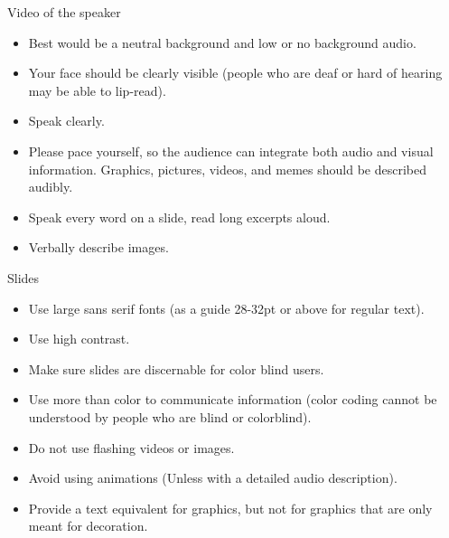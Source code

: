 \documentclass[
  ignorenonframetext,
]{beamer}
\providecommand{\tightlist}{%
  \setlength{\itemsep}{0pt}\setlength{\parskip}{0pt}}
\begin{document}
\begin{frame}

\begin{block}{Video of the speaker}

\begin{itemize}
\tightlist
\item
  Best would be a neutral background and low or no background audio.
\item
  Your face should be clearly visible (people who are deaf or hard of
  hearing may be able to lip-read).
\item
  Speak clearly.
\item
  Please pace yourself, so the audience can integrate both audio and
  visual information. Graphics, pictures, videos, and memes should be
  described audibly.
\item
  Speak every word on a slide, read long excerpts aloud.
\item
  Verbally describe images.
\end{itemize}

\end{block}

\end{frame}

\begin{frame}

\begin{block}{Slides}

\begin{itemize}
\tightlist
\item
  Use large sans serif fonts (as a guide 28-32pt or above for regular
  text).
\item
  Use high contrast.
\item
  Make sure slides are discernable for color blind users.
\item
  Use more than color to communicate information (color coding cannot be
  understood by people who are blind or colorblind).
\item
  Do not use flashing videos or images.
\item
  Avoid using animations (Unless with a detailed audio description).
\item
  Provide a text equivalent for graphics, but not for graphics that are
  only meant for decoration.
\end{itemize}

\end{block}

\end{frame}
\end{document}
